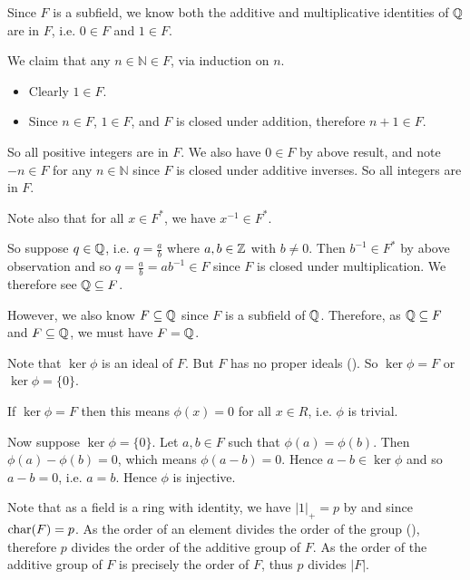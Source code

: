 \begin{questions}
    \item Since $F$ is a subfield, we know both the additive and multiplicative identities of $\mathbb{Q}$ are in $F$, i.e. $0 \in F$ and $1 \in F$.

    We claim that any $n \in \mathbb{N} \in F$, via induction on $n$.
    \begin{itemize}
        \item Clearly $1 \in F$.
        \item Since $n \in F$, $1 \in F$, and $F$ is closed under addition, therefore $n + 1 \in F$.
    \end{itemize}
    So all positive integers are in $F$. We also have $0 \in F$ by above result, and note $-n \in F$ for any $n \in \mathbb{N}$ since $F$ is closed under additive inverses. So all integers are in $F$.

    Note also that for all $x \in F^\ast$, we have $x^{-1} \in F^\ast$.

    So suppose $q \in \mathbb{Q}$, i.e. $q = \frac ab$ where $a, b \in \mathbb{Z}$ with $b \neq 0$. Then $b^{-1} \in F^\ast$ by above observation and so $q = \frac ab = ab^{-1} \in F$ since $F$ is closed under multiplication. We therefore see $\mathbb{Q} \subseteq F$.

    However, we also know $F \subseteq \mathbb{Q}$ since $F$ is a subfield of $\mathbb{Q}$. Therefore, as $\mathbb{Q} \subseteq F$ and $F \subseteq \mathbb{Q}$, we must have $F = \mathbb{Q}$.

    \item Note that $\ker\phi$ is an ideal of $F$. But $F$ has no proper ideals (). So $\ker\phi = F$ or $\ker\phi = \{0\}$.

    If $\ker\phi = F$ then this means $\phi(x) = 0$ for all $x\in R$, i.e. $\phi$ is trivial.

    Now suppose $\ker\phi = \{0\}$. Let $a, b \in F$ such that $\phi(a) = \phi(b)$. Then $\phi(a) - \phi(b) = 0$, which means $\phi(a - b) = 0$. Hence $a - b \in \ker\phi$ and so $a - b = 0$, i.e. $a = b$. Hence $\phi$ is injective.

    \item \begin{partquestions}{\roman*}
        \item Note that as a field is a ring with identity, we have $|1|_+ = p$ by  and since $\mathrm{char}(F) = p$. As the order of an element divides the order of the group (), therefore $p$ divides the order of the additive group of $F$. As the order of the additive group of $F$ is precisely the order of $F$, thus $p$ divides $|F|$.


\end{partquestions}
\end{questions}
